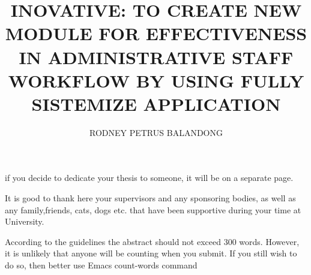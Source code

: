 
\raggedbottom 

\title{INOVATIVE: TO CREATE NEW MODULE FOR EFFECTIVENESS IN ADMINISTRATIVE STAFF WORKFLOW BY USING FULLY SISTEMIZE APPLICATION}

\author{RODNEY PETRUS BALANDONG}




\copyrightyear{\number\the\year} %


\beforepreface %


\clearpage
{}
\begin{center}
if you decide to dedicate your thesis to someone, it will be on a separate page.
\end{center}

\renewcommand\listtablename{\normalsize\normalfont\centering\vspace*{-0.5in} ACKNOWLEDGEMENTS}
\begin{singlespace} 


It is good to thank here your supervisors and any sponsoring bodies, as well as any family,friends, cats, dogs etc. that have been supportive during your time at University.
\end{singlespace}
\iftablespage
{}
{}%

\renewcommand\listtablename{\normalsize\normalfont\centering\vspace*{-0.5in} ABSTRACT}
\iftablespage
{}
{}

According to the guidelines the abstract should not exceed 300 words. However, it is unlikely that anyone will be counting when you submit. If you still wish to do so, then better use
Emacs count-words command 


